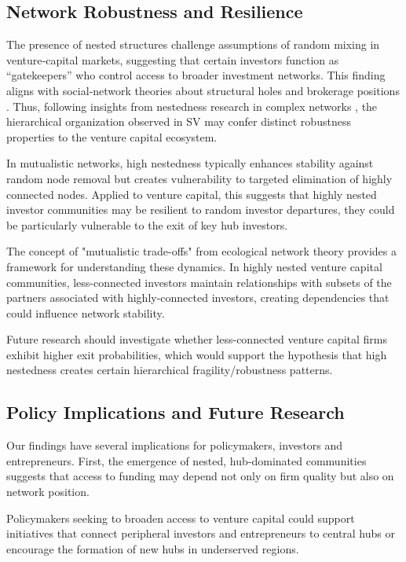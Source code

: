 \subsection{Network Robustness and Resilience}

The presence of nested structures challenge assumptions of random mixing in venture‑capital markets, suggesting that certain investors function as “gatekeepers” who control access to broader investment networks.  This finding aligns with social‑network theories about structural holes and brokerage positions \cite{Burt1992,Borgatti2009}. Thus, following insights from nestedness research in complex networks \cite{Mariani2019}, the hierarchical organization observed in SV may confer distinct robustness properties to the venture capital ecosystem. 

In mutualistic networks, high nestedness typically enhances stability against random node removal but creates vulnerability to targeted elimination of highly connected nodes. Applied to venture capital, this suggests that highly nested investor communities may be resilient to random investor departures, they could be particularly vulnerable to the exit of key hub investors.

The concept of "mutualistic trade-offs" from ecological network theory provides a framework for understanding these dynamics. In highly nested venture capital communities, less-connected investors maintain relationships with subsets of the partners associated with highly-connected investors, creating dependencies that could influence network stability. 

Future research should investigate whether less-connected venture capital firms exhibit higher exit probabilities, which would support the hypothesis that high nestedness creates certain hierarchical fragility/robustness patterns.

\subsection{Policy Implications and Future Research}

Our findings have several implications for policymakers, investors and entrepreneurs.  First, the emergence of nested, hub‑dominated communities suggests that access to funding may depend not only on firm quality but also on network position.

Policymakers seeking to broaden access to venture capital could support initiatives that connect peripheral investors and entrepreneurs to central hubs or encourage the formation of new hubs in underserved regions.  

